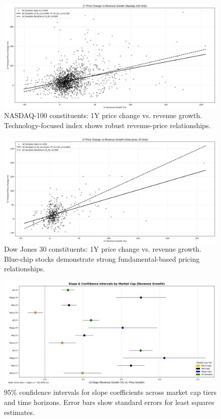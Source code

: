 \documentclass[11pt]{article}
\begin{document}
\begin{figure}[!htbp]
\centering
\includegraphics[width=\textwidth]{images/1_year_nasdaq100_plot.png}
\caption{NASDAQ-100 constituents: 1Y price change vs. revenue growth. Technology-focused index shows robust revenue-price relationships.}
\label{fig:nasdaq100}
\end{figure}

\begin{figure}[!htbp]
\centering
\includegraphics[width=\textwidth]{images/1_year_dow30_plot.png}
\caption{Dow Jones 30 constituents: 1Y price change vs. revenue growth. Blue-chip stocks demonstrate strong fundamental-based pricing relationships.}
\label{fig:dow30}
\end{figure}
\begin{figure}[!htbp]
\centering
\includegraphics[width=\textwidth]{images/all_horizons_confidence_intervals.png}
\caption{95\% confidence intervals for slope coefficients across market cap tiers and time horizons. Error bars show standard errors for least squares estimates.}
\label{fig:confidence-intervals}
\end{figure}
\end{document}
